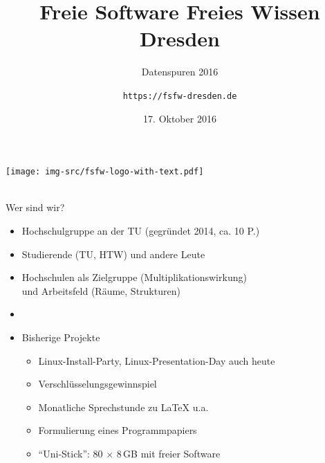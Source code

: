 \documentclass[t]{beamer}
\title{Freie Software Freies Wissen Dresden}
\subtitle{Datenspuren 2016}
\author{\texttt{https://fsfw-dresden.de}}
\date{17. Oktober 2016}
\begin{document}
\begin{frame}
  \begin{center}%
\texttt{[image: img-src/fsfw-logo-with-text.pdf]}\\%
\vspace*{-1em}{Freie Software Freies Wissen}\\[1em]
  \end{center}
\end{frame}



\begin{frame}[label=ct1]{\color{fg}Wer sind wir?}

  \begin{itemize}
  \item Hochschulgruppe an der TU (gegründet 2014, ca. 10 P.)
  \item Studierende (TU, HTW) und andere Leute
  \item Hochschulen als Zielgruppe (Multiplikationswirkung)\\
  und Arbeitsfeld (Räume, Strukturen)
  \item[]
  \pause
  \item Bisherige Projekte
  \begin{itemize}
   \item Linux-Install-Party, Linux-Presentation-Day {\tiny auch heute}
   \item Verschlüsselungsgewinnspiel
   \item Monatliche Sprechstunde zu \LaTeX{} u.a.
   \item Formulierung eines Programmpapiers
   \item "`Uni-Stick"': 80 $\times$ 8\,GB mit freier Software
  \end{itemize}
  \end{itemize}  
\end{frame}

\end{document}

